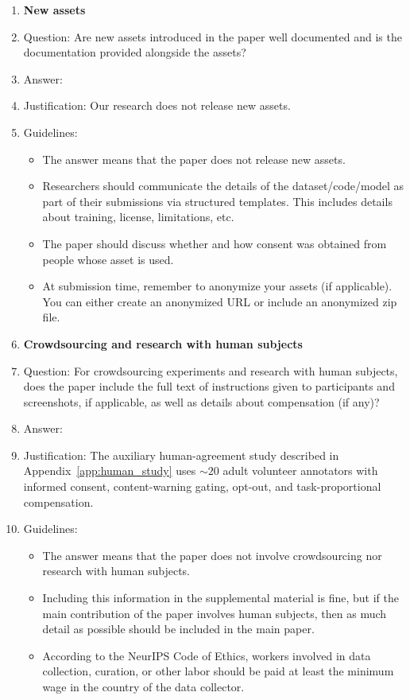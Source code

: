 \begin{enumerate}
\item {\bf New assets}
    \item[] Question: Are new assets introduced in the paper well documented and is the documentation provided alongside the assets?
    \item[] Answer: \answerNA{}
    \item[] Justification: Our research does not release new assets.
    \item[] Guidelines:
    \begin{itemize}
        \item The answer \answerNA{} means that the paper does not release new assets.
        \item Researchers should communicate the details of the dataset\slash code\slash model as part of their submissions via structured templates. This includes details about training, license, limitations, etc.
        \item The paper should discuss whether and how consent was obtained from people whose asset is used.
        \item At submission time, remember to anonymize your assets (if applicable). You can either create an anonymized URL or include an anonymized zip file.
    \end{itemize}

\item {\bf Crowdsourcing and research with human subjects}
    \item[] Question: For crowdsourcing experiments and research with human subjects, does the paper include the full text of instructions given to participants and screenshots, if applicable, as well as details about compensation (if any)?
    \item[] Answer: \answerYes{}
    \item[] Justification: The auxiliary human-agreement study described in Appendix~\ref{app:human_study} uses $\sim\!20$ adult volunteer annotators with informed consent, content-warning gating, opt-out, and task-proportional compensation.
    \item[] Guidelines:
    \begin{itemize}
        \item The answer \answerNA{} means that the paper does not involve crowdsourcing nor research with human subjects.
        \item Including this information in the supplemental material is fine, but if the main contribution of the paper involves human subjects, then as much detail as possible should be included in the main paper.
        \item According to the NeurIPS Code of Ethics, workers involved in data collection, curation, or other labor should be paid at least the minimum wage in the country of the data collector.
    \end{itemize}


\end{enumerate}
